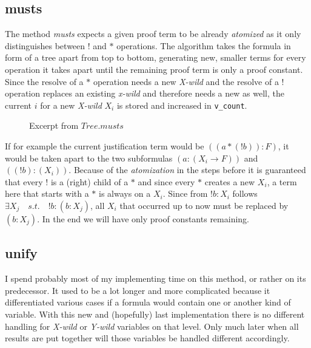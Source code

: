\subsection{musts}

The method \emph{musts} expects a given proof term to be already \emph{atomized} as it only distinguishes between $!$ and $*$ operations.
The algorithm takes the formula in form of a tree apart from top to bottom, generating new, smaller terms for every operation it takes apart until the remaining proof term is only a proof constant. Since the resolve of a $*$ operation needs a new \emph{X-wild} and the resolve of a $!$ operation replaces an existing \emph{x-wild} and therefore needs a new as well, the current $i$ for a new \emph{X-wild} $X_i$ is stored and increased in \texttt{v\_count}.

\begin{figure}[H]
    \vspace{-10pt}
	
	\vspace{-10pt}
	\caption{Excerpt from $Tree.musts$}
	\vspace{-10pt}
\end{figure}

If for example the current justification term would be $((a*(!b)):F)$, it would be taken apart to the two subformulas $(a:(X_i\rightarrow F))$ and $((!b):(X_i))$. Because of the \emph{atomization} in the steps before it is guaranteed that every $!$ is a (right) child of a  $*$ and since every $*$ creates a new $X_i$, a term here that starts with a $*$ is always on a $X_i$. Since from $!b:X_i$ follows $\exists X_j \quad s.t. \quad !b:(b:X_j)$, all $X_i$ that occurred up to now must be replaced by $(b:X_j)$. In the end we will have only proof constants remaining.

\subsection{unify}
I spend probably most of my implementing time on this method, or rather on its predecessor. It used to be a lot longer and more complicated because it differentiated various cases if a formula would contain one or another kind of variable.
With this new and (hopefully) last implementation there is no different handling for \emph{X-wild} or \emph{Y-wild} variables on that level. Only much later when all results are put together will those variables be handled different accordingly.

